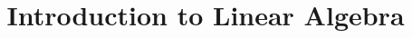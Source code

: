 


\usepackage{graphicx}



\theoremstyle{definition} 
\newtheorem*{defn}{Definition}
\newtheorem*{pyth}{Pythagorean Theorem}

\theoremstyle{definition}
\newtheorem{myexa}{Exercise}

\theoremstyle{definition}
\newtheorem{myexb}{Exercise}

\theoremstyle{definition}
\newtheorem{myexc}{Exercise}

\newcommand{\bd}[1]{\textbf{#1}} 
\newcommand{\oq}[4]{\ensuremath{({#1},{#2},{#3},{#4})}}
\newcommand{\ot}[3]{\ensuremath{({#1},{#2},{#3})}}
\newcommand{\op}[2]{\ensuremath{({#1},{#2})}}
\newcommand{\vect}[1]{\ensuremath{\mathbf{#1}}}
\newcommand{\mtx}[1]{\ensuremath{\texttt{#1}}}

\setcounter{endnote}{-1}

\StudentVersion
%



\large
\frontmatter
\title{Introduction to Linear Algebra}
\author{}
\affiliation{}
\maketitle
\tableofcontents









